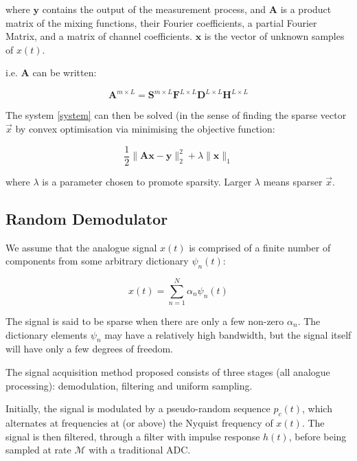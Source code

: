 \documentclass[12pt]{report}
\begin{document}
where \(\textbf{y}\) contains the output of the measurement process, and \(\textbf{A}\) is a product matrix of the mixing functions, their Fourier coefficients, a partial Fourier Matrix, and a matrix of channel coefficients. \(\textbf{x}\) is the vector of unknown samples of \(x\left(t\right)\). 

i.e. \(\textbf{A}\) can be written: 

\begin{equation}
\textbf{A}^{m\times L} = \textbf{S}^{m\times L} \textbf{F}^{L\times L} \textbf{D}^{L \times L} \textbf{H}^{L \times L}
\end{equation}

The system  \ref{system} can then be solved (in the sense of finding the sparse vector \(\vec{x}\) by convex optimisation via minimising the objective function:

\begin{equation}
\frac{1}{2}\|\textbf{Ax}-\textbf{y}\|_2^2 + \lambda \|\textbf{x}\|_1
\end{equation}

where \(\lambda\) is a parameter chosen to promote sparsity. Larger \(\lambda\) means sparser \(\vec{x}\).

\subsection{Random Demodulator}
We assume that the analogue signal \(x\left(t\right)\) is comprised of a finite number of components from some arbitrary dictionary \(\psi_n\left(t\right)\):

\begin{equation}
x\left(t\right) = \sum_{n=1}^N \alpha_n \psi_n\left(t\right)
\end{equation}

The signal is said to be sparse when there are only a few non-zero \(\alpha_n\). The dictionary elements \(\psi_n\) may have a relatively high bandwidth, but the signal itself will have only a few degrees of freedom.

The signal acquisition method proposed consists of three stages (all analogue processing): demodulation, filtering and uniform sampling. 

Initially, the signal is modulated by a pseudo-random sequence \(p_c\left(t\right)\), which alternates at frequencies at (or above) the Nyquist frequency of \(x\left(t\right)\). The signal is then filtered, through a filter with impulse response \(h\left(t\right)\), before being sampled at rate \(\mathcal{M}\) with a traditional ADC.
\end{document}
